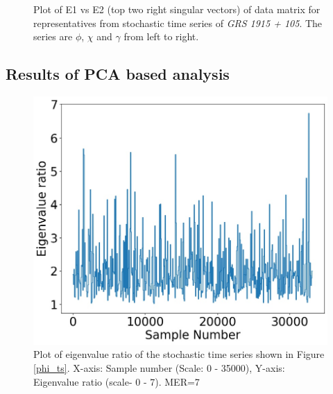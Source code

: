 \documentclass[10pt,conference]{IEEEtran}
\begin{document}
\begin{figure}
   \centering
\caption{Plot of E1 vs E2 (top two right singular vectors) of data matrix for  representatives from  stochastic time series  of \textit{GRS 1915 + 105}. The series are $\phi$, $\chi$ and $\gamma$ from left to right.}
   \label{svd_e1e2_stochastic}
\end{figure}


\subsection{Results of PCA based analysis}

\begin{figure}[ht]
\centering
\includegraphics[width=1\linewidth]{sac_ascf_phi_eig.jpg}
\caption{Plot of eigenvalue ratio of the stochastic time series shown in Figure \ref{phi_ts}. X-axis: Sample number (Scale: 0 - 35000), Y-axis: Eigenvalue ratio (scale- 0 - 7). MER=7}
\label{phi_eig}
\end{figure}
\end{document}
